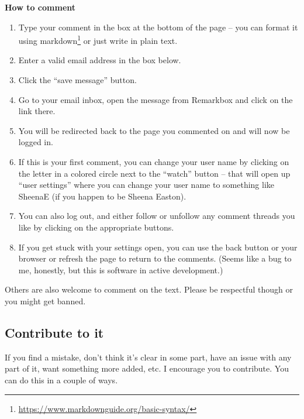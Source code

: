 \documentclass[12pt, openany]{book}
\makeatletter
\providecommand{\tightlist}{%
  \setlength{\itemsep}{0pt}\setlength{\parskip}{0pt}}
\renewcommand{\href}[2]{#2\footnote{\url{#1}}}
\newenvironment{kframe}{%
\medskip{}
\setlength{\fboxsep}{.8em}
 \def\at@end@of@kframe{}%
 \ifinner\ifhmode%
  \def\at@end@of@kframe{\end{minipage}}%
  \begin{minipage}{\columnwidth}%
 \fi\fi%
 \def\FrameCommand##1{\hskip\@totalleftmargin \hskip-\fboxsep
 \colorbox{shadecolor}{##1}\hskip-\fboxsep
     \hskip-\linewidth \hskip-\@totalleftmargin \hskip\columnwidth}%
 \MakeFramed {\advance\hsize-\width
   \@totalleftmargin\z@ \linewidth\hsize
   \@setminipage}}%
 {\par\unskip\endMakeFramed%
 \at@end@of@kframe}
\newenvironment{rmdblock}[1]
  {
  \begin{itemize}
  \renewcommand{\labelitemi}{
    \raisebox{-.7\height}[0pt][0pt]{
      {\setkeys{Gin}{width=3em,keepaspectratio}\texttt{[image: img/\#1]}}
    }
  }
  \setlength{\fboxsep}{1em}
  \begin{kframe}
  \item
  }
  {
  \end{kframe}
  \end{itemize}
  }
\newenvironment{rmdimportant}
  {\begin{rmdblock}{important}}
  {\end{rmdblock}}
\makeatother
\begin{document}
\begin{rmdimportant}
\textbf{How to comment}

\begin{enumerate}
\def\labelenumi{\arabic{enumi}.}
\tightlist
\item
  Type your comment in the box at the bottom of the page -- you can
  format it using
  \href{https://www.markdownguide.org/basic-syntax/}{markdown} or just
  write in plain text.
\item
  Enter a valid email address in the box below.
\item
  Click the ``save message'' button.
\item
  Go to your email inbox, open the message from Remarkbox and click on
  the link there.
\item
  You will be redirected back to the page you commented on and will now
  be logged in.
\item
  If this is your first comment, you can change your user name by
  clicking on the letter in a colored circle next to the ``watch''
  button -- that will open up ``user settings'' where you can change
  your user name to something like SheenaE (if you happen to be Sheena
  Easton).
\item
  You can also log out, and either follow or unfollow any comment
  threads you like by clicking on the appropriate buttons.
\item
  If you get stuck with your settings open, you can use the back button
  or your browser or refresh the page to return to the comments. (Seems
  like a bug to me, honestly, but this is software in active
  development.)
\end{enumerate}
\end{rmdimportant}

Others are also welcome to comment on the text. Please be respectful though or you might get banned.

\hypertarget{contribute-to-it}{%
\subsection*{Contribute to it}\label{contribute-to-it}}


If you find a mistake, don't think it's clear in some part, have an issue with any part of it, want something more added, etc. I encourage you to contribute. You can do this in a couple of ways.
\end{document}
